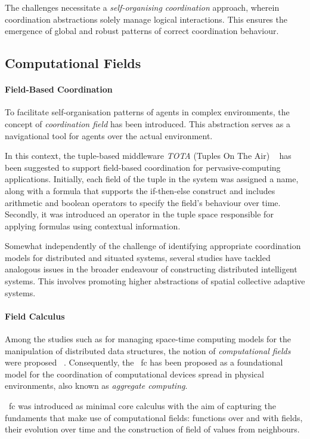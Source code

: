 The challenges necessitate a \emph{self-organising coordination} approach, wherein coordination abstractions solely
manage logical interactions.
This ensures the emergence of global and robust patterns of correct coordination behaviour.

\subsection{Computational Fields}
\label{subsec:computational-fields}

\paragraph{Field-Based Coordination}
To facilitate self-organisation patterns of agents in complex environments, the concept of \emph{coordination field}
has been introduced.
This abstraction serves as a navigational tool for agents over the actual environment.

In this context, the tuple-based middleware \emph{TOTA} (Tuples On The Air) ~\cite{10.1145/1538942.1538945}
has been suggested to support field-based coordination for pervasive-computing applications.
Initially, each field of the tuple in the system was assigned a name, along with a formula that supports the
if-then-else construct and includes arithmetic and boolean operators to specify the field's behaviour over time.
Secondly, it was introduced an operator in the tuple space responsible for applying formulas using contextual information.

Somewhat independently of the challenge of identifying appropriate coordination models for distributed and situated systems,
several studies have tackled analogous issues in the broader endeavour of constructing distributed intelligent systems.
This involves promoting higher abstractions of spatial collective adaptive systems.

\paragraph{Field Calculus}
Among the studies such as for managing space-time computing models for the manipulation of distributed data structures,
the notion of \emph{computational fields} were proposed ~\cite{VIROLI2019100486}.
Consequently, the ~\ac{fc} has been proposed as a foundational model for the coordination of computational
devices spread in physical environments, also known as \emph{aggregate computing}.

~\ac{fc} was introduced as minimal core calculus with the aim of capturing the fundaments that make use of computational
fields: functions over and with fields, their evolution over time and the construction of field of values from neighbours.

